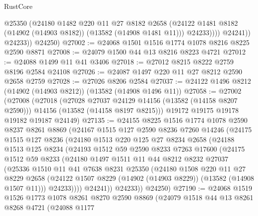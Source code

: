 \begin{lexlean}{RustCore}
\begin{coremodule}
                    @25350
                    (@24180
                      @1482
                      @220
                      @11
                      @27
                      @8182
                      @2658
                      (@24122 @1481 @8182 (@14902 (@14903 @8182)) (@13582 (@14908 @1481 @11)))
                      @24233))))
              @24241))
          @24233))
      @24250)
@27002 := @24068 @1501 @1516 @1774 @1078 @8216 @8225 @2590 @8871
@27008 := @24079 @1500 @44 @13 @8216 @8223 @4721
@27012 := @24088 @1499 @11 @41 @3406
@27018 := @27012 @8215 @8222 @2759 @8196 @2584 @24108
@27026 := @24087 @1497 @220 @11 @27 @8212 @2590 @2658 @2759
@27028 := @27026 @8206 @2584
@27037 := @24122 @1496 @8212 (@14902 (@14903 @8212)) (@13582 (@14908 @1496 @11))
@27058 := @27002
    (@27008
      (@27018
        (@27028 @27037 @24129 @14156 (@13582 (@14158 @8207 @2590)))
        @14156
        (@13582 (@14158 @8197 @8215)))
      @19172
      @19175
      @19178
      @19182
      @19187
      @24149)
@27135 := @24155
    @8225
    @1516
    @1774
    @1078
    @2590
    @8237
    @8261
    @8869
    (@24167
      @1515
      @127
      @2590
      @8236
      @7260
      @14246
      (@24175
        @1515
        @127
        @8236
        (@24180
          @1513
          @220
          @125
          @27
          @8234
          @2658
          (@24188
            @1513
            @125
            @8234
            (@24193
              @1512
              @59
              @2590
              @8233
              @7263
              @17600
              (@24175
                @1512
                @59
                @8233
                (@24180
                  @1497
                  @1511
                  @11
                  @44
                  @8212
                  @8232
                  @27037
                  (@25336
                    @1510
                    @11
                    @41
                    @7638
                    @8231
                    @25350
                    (@24180
                      @1508
                      @220
                      @11
                      @27
                      @8229
                      @2658
                      (@24122 @1507 @8229 (@14902 (@14903 @8229)) (@13582 (@14908 @1507 @11)))
                      @24233))))
              @24241))
          @24233))
      @24250)
@27190 := @24068
    @1519
    @1526
    @1773
    @1078
    @8261
    @8270
    @2590
    @8869
    (@24079
      @1518
      @44
      @13
      @8261
      @8268
      @4721
      (@24088
        @1177

\end{coremodule}
\end{lexlean}
